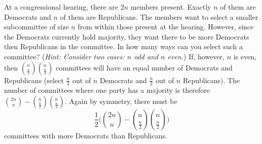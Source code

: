 \documentclass[12pt,twoside]{article}
\newcommand{\hint}[1]{({\it Hint: #1})}
\begin{document}

\begin{problem}{20}
At a congressional hearing, there are $2n$ members present. Exactly $n$ of them are Democrats and $n$ of them are Republicans. The members want to select a smaller subcommittee of size $n$ from within those present at the hearing. However, since the Democrats currently hold majority, they want there to be more Democrats then Republicans in the committee. In how many ways can you select such a committee?
\hint{Consider two cases: $n$ odd and $n$ even.}
If, however, $n$ is even, then $\binom{n}{\frac{n}2}\binom{n}{\frac{n}2}$ committees will have an equal number of Democrats and Republicans (select $\frac{n}{2}$ out of $n$ Democrats and $\frac{n}{2}$ out of $n$ Republicans). The number of committees where one party has a majority is therefore $\binom{2n}{n}-\binom{n}{\frac{n}2}\binom{n}{\frac{n}2}$. Again by symmetry, there must be 
\[\frac12\Big(\binom{2n}{n}-\binom{n}{\frac{n}2}\binom{n}{\frac{n}2}\Big)\]
committees with more Democrats than Republicans.
\end{problem}
\end{document}
